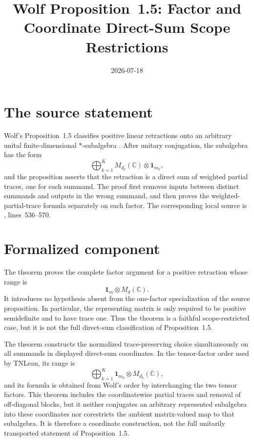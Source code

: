 \documentclass{article}
\title{Wolf Proposition~1.5: Factor and Coordinate Direct-Sum Scope Restrictions}
\author{}
\date{2026-07-18}
\begin{document}
\maketitle
{}

\section{The source statement}

Wolf's Proposition~1.5 classifies positive linear retractions onto an arbitrary
unital finite-dimensional $*$-subalgebra
\cite[Proposition~1.5 and Equation~(1.40)]{Wolf2012Quantum}.  After unitary
conjugation, the subalgebra has the form
\[
    \bigoplus_{k=1}^{K} M_{d_k}(\mathbb C)\otimes\mathbf 1_{m_k},
\]
and the proposition asserts that the retraction is a direct sum of weighted
partial traces, one for each summand.  The proof first removes inputs between
distinct summands and outputs in the wrong summand, and then proves the
weighted-partial-trace formula separately on each factor.  The corresponding
local source is
, lines~536--570.

\section{Formalized component}

The theorem
 proves
the complete factor argument for a positive retraction whose range is
\[
    \mathbf 1_m\otimes M_d(\mathbb C).
\]
It introduces no hypothesis absent from the one-factor specialization of the
source proposition.  In particular, the representing matrix is only required
to be positive semidefinite and to have trace one.  Thus the theorem is a
faithful scope-restricted case, but it is not the full direct-sum
classification of Proposition~1.5.

The theorem
constructs the normalized trace-preserving choice simultaneously on all
summands in displayed direct-sum coordinates.  In the tensor-factor order used
by TNLean, its range is
\[
    \bigoplus_{k=1}^{K}\mathbf 1_{m_k}\otimes M_{d_k}(\mathbb C),
\]
and its formula is obtained from Wolf's order by interchanging the two tensor
factors.  This theorem includes the coordinatewise partial traces and removal
of off-diagonal blocks, but it neither conjugates an arbitrary represented
subalgebra into these coordinates nor corestricts the ambient matrix-valued map
to that subalgebra.  It is therefore a coordinate construction, not the full
unitarily transported statement of Proposition~1.5.
\end{document}
